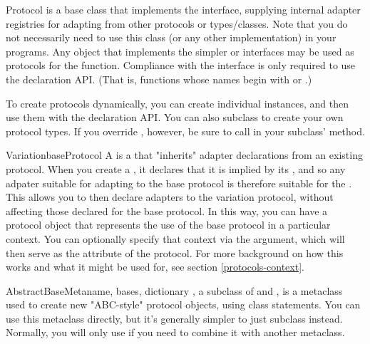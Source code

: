 \begin{verbatim%
}
\begin{verbatim%
}
\begin{verbatim%
}
\begin{verbatim%
}
\begin{verbatim%
}
\begin{verbatim%
}
\begin{classdesc*}{Protocol}
 is a base class that implements the 
interface, supplying internal adapter registries for adapting from other
protocols or types/classes.  Note that you do not necessarily need to use this
class (or any other  implementation) in
your programs.  Any object that implements the simpler  or
 interfaces may be used as protocols for the
 function.  Compliance with the 
interface is only required to use the  declaration API.
(That is, functions whose names begin with  or .)

To create protocols dynamically, you can create individual 
instances, and then use them with the declaration API.  You can also subclass
 to create your own protocol types.  If you override
, however, be sure to call 
in your subclass'  method.
\end{classdesc*}

\begin{classdesc}{Variation}{baseProtocol }
A  is a  that "inherits" adapter declarations
from an existing protocol.  When you create a , it declares
that it is implied by its , and so any adpater suitable for
adapting to the base protocol is therefore suitable for the .
This allows you to then declare adapters to the variation protocol, without
affecting those declared for the base protocol.  In this way, you can have a
protocol object that represents the use of the base protocol in a particular
context.  You can optionally specify that context via the 
argument, which will then serve as the  attribute of the
protocol.  For more background on how this works and what it might be used for,
see section \ref{protocols-context}.
\end{classdesc}


\begin{classdesc}{AbstractBaseMeta}{name, bases, dictionary}
, a subclass of  and , is a
metaclass used to create new "ABC-style" protocol objects, using class
statements.  You can use this metaclass directly, but it's generally simpler to
just subclass  instead.  Normally, you will only use
 if you need to combine it with another metaclass.
\end{classdesc}


\end{verbatim%
}
\end{verbatim%
}
\end{verbatim%
}
\end{verbatim%
}
\end{verbatim%
}
\end{verbatim%
}
